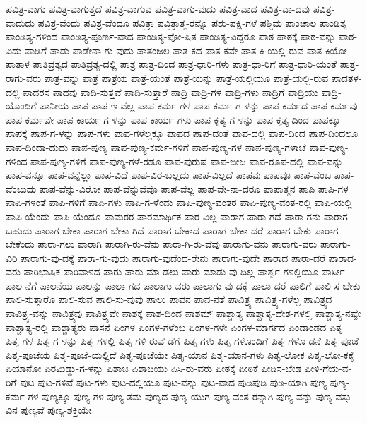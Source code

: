 {ಪವಿತ್ರ-ವಾಗು
ಪವಿತ್ರ-ವಾಗುತ್ತದೆ
ಪವಿತ್ರ-ವಾಗುವ
ಪವಿತ್ರ-ವಾಗು-ವುದು
ಪವಿತ್ರ-ವಾದ
ಪವಿತ್ರ-ವಾ-ದವು
ಪವಿತ್ರ-ವಾದುದು
ಪವಿತ್ರ-ವೆಂದು
ಪವಿತ್ರ-ವೆಂದೂ
ಪವಿತ್ರಾ
ಪವಿತ್ರಾತ್ಮ-ರನ್ನೊ
ಪಶು-ಪಕ್ಷಿ-ಗಳೆ
ಪಶ್ಚಿಮ
ಪಾಂಚಾಲ
ಪಾಂಡಿತ್ಯ
ಪಾಂಡಿತ್ಯ-ಗಳಿಂದ
ಪಾಂಡಿತ್ಯ-ಪೂರ್ಣ-ವಾದ
ಪಾಂಡಿತ್ಯ-ಪೋ-ಷಿತ
ಪಾಂಡಿತ್ಯ-ವಿದ್ದರೂ
ಪಾಠ
ಪಾಠಕ್ಕೆ
ಪಾಠ-ವನ್ನು
ಪಾಠ-ವಿದು
ಪಾಡಿಗೆ
ಪಾಡು
ಪಾಡೇನಾ-ಗು-ವುದು
ಪಾತಂಜಲ
ಪಾತ-ಕದ
ಪಾತ-ಕವೇ
ಪಾತ-ಕಿ-ಯಲ್ಲಿ-ರುವ
ಪಾತ-ಕಿಯೋ
ಪಾತಾಳ
ಪಾತಿವ್ರತ್ಯದ
ಪಾತಿವ್ರತ್ಯ-ದಲ್ಲಿ
ಪಾತ್ರ
ಪಾತ್ರ-ದಿಂದ
ಪಾತ್ರ-ಧಾರಿ-ಗಳು
ಪಾತ್ರ-ಧಾ-ರಿಗೆ
ಪಾತ್ರ-ಧಾರಿ-ಯಂತೆ
ಪಾತ್ರ-ರಾಗು-ವರು
ಪಾತ್ರ-ವನ್ನು
ಪಾತ್ರೆ
ಪಾತ್ರೆಯ
ಪಾತ್ರೆ-ಯಂತೆ
ಪಾತ್ರೆ-ಯನ್ನು
ಪಾತ್ರೆ-ಯಲ್ಲಿಯೂ
ಪಾತ್ರೆ-ಯಲ್ಲಿ-ರುವ
ಪಾದತಳ-ದಲ್ಲಿ
ಪಾದರಸ
ಪಾದವು
ಪಾದಿ-ಸುತ್ತವೆ
ಪಾದಿ-ಸುತ್ತಾರೆ
ಪಾದ್ರಿ
ಪಾದ್ರಿ-ಗಳ
ಪಾದ್ರಿ-ಗಳು
ಪಾದ್ರಿಗೆ
ಪಾದ್ರಿಯು
ಪಾದ್ರಿ-ಯೊಂದಿಗೆ
ಪಾನೀಯ
ಪಾಪ
ಪಾಪ-ಇ-ವೆಲ್ಲ
ಪಾಪ-ಕರ್ಮ-ಗಳ
ಪಾಪ-ಕರ್ಮ-ಗ-ಳನ್ನು
ಪಾಪ-ಕರ್ಮದ
ಪಾಪ-ಕರ್ಮವು
ಪಾಪ-ಕರ್ಮವೇ
ಪಾಪ-ಕಾರ್ಯ-ಗ-ಳನ್ನು
ಪಾಪ-ಕಾರ್ಯ-ಗಳು
ಪಾಪ-ಕೃತ್ಯ-ಗ-ಳನ್ನು
ಪಾಪ-ಕೃತ್ಯ-ದಿಂದ
ಪಾಪಕ್ಕೂ
ಪಾಪಕ್ಕೆ
ಪಾಪ-ಗ-ಳನ್ನು
ಪಾಪ-ಗಳು
ಪಾಪ-ಗಳೆಲ್ಲಕ್ಕೂ
ಪಾಪದ
ಪಾಪ-ದಂತೆ
ಪಾಪ-ದಲ್ಲಿ
ಪಾಪ-ದಿಂದ
ಪಾಪ-ದಿಂದಲೂ
ಪಾಪ-ದಿಂದಾ-ದುದು
ಪಾಪ-ಪುಣ್ಯ
ಪಾಪ-ಪುಣ್ಯ-ಕರ್ಮ-ಗಳಿಗೆ
ಪಾಪ-ಪುಣ್ಯ-ಗಳ
ಪಾಪ-ಪುಣ್ಯ-ಗಳಾಚೆ
ಪಾಪ-ಪುಣ್ಯ-ಗಳಿಂದ
ಪಾಪ-ಪುಣ್ಯ-ಗಳಿಗೆ
ಪಾಪ-ಪುಣ್ಯ-ಗಳೆ-ರಡೂ
ಪಾಪ-ಪುರುಷ
ಪಾಪ-ಬೀಜ
ಪಾಪ-ರೂಪ-ದಲ್ಲಿ
ಪಾಪ-ವನ್ನು
ಪಾಪ-ವನ್ನೂ
ಪಾಪ-ವನ್ನೆಲ್ಲಾ
ಪಾಪ-ವಿದೆ
ಪಾಪ-ವಿರ-ಬಲ್ಲದು
ಪಾಪ-ವಿಲ್ಲದೆ
ಪಾಪವು
ಪಾಪವೂ
ಪಾಪ-ವೆಂಬ
ಪಾಪ-ವೆಂಬುದು
ಪಾಪ-ವೆನ್ನು-ವಿರೋ
ಪಾಪ-ವೆನ್ನುವೆವೊ
ಪಾಪ-ವೆಲ್ಲ
ಪಾಪ-ವೇ-ನಾ-ದರೂ
ಪಾಪಾತ್ಮನ
ಪಾಪಿ
ಪಾಪಿ-ಗಳ
ಪಾಪಿ-ಗಳಂತೆ
ಪಾಪಿ-ಗಳಿಗೆ
ಪಾಪಿ-ಗಳು
ಪಾಪಿ-ಗ-ಳೆಂದು
ಪಾಪಿ-ಪುಣ್ಯ-ವಂತರ
ಪಾಪಿ-ಪುಣ್ಯ-ವಂತ-ರಲ್ಲಿ
ಪಾಪಿ-ಯಲ್ಲಿ
ಪಾಪಿ-ಯೆಂದು
ಪಾಪಿ-ಯೆಂದೂ
ಪಾಮರರ
ಪಾರಮಾರ್ಥಿಕ
ಪಾರ-ವಿಲ್ಲ
ಪಾರಾಗ
ಪಾರಾ-ಗದೆ
ಪಾರಾ-ಗನು
ಪಾರಾಗ-ಬಹುದು
ಪಾರಾಗ-ಬೇಕಾ
ಪಾರಾಗ-ಬೇಕಾ-ಗಿದೆ
ಪಾರಾಗ-ಬೇಕಾದ
ಪಾರಾಗ-ಬೇಕಾ-ದರೆ
ಪಾರಾಗ-ಬೇಕು
ಪಾರಾಗ-ಬೇಕೆಂದು
ಪಾರಾ-ಗಲು
ಪಾರಾಗಿ
ಪಾರಾಗಿ-ರು-ವೆನು
ಪಾರಾ-ಗಿ-ರು-ವೆವು
ಪಾರಾಗು-ವನು
ಪಾರಾಗು-ವರು
ಪಾರಾಗು-ವಿರಿ
ಪಾರಾಗು-ವು-ದಕ್ಕೆ
ಪಾರಾ-ಗು-ವುದು
ಪಾರಾಗು-ವುದೆಂದ-ರೇನು
ಪಾರಾಗು-ವುದೇ
ಪಾರಾದ
ಪಾರಾ-ದರೆ
ಪಾರಾದ-ವರು
ಪಾರಿಭಾಷಿಕ
ಪಾರಿವಾಳದ
ಪಾರು
ಪಾರು-ಮಾ-ಡಲು
ಪಾರು-ಮಾಡು-ವು-ದಿಲ್ಲ
ಪಾರ್ಶ್ವ-ಗಳಲ್ಲಿಯೂ
ಪಾರ್ಸೀ
ಪಾಲ-ನೆಗೆ
ಪಾಲನೆಯ
ಪಾಲನ್ನು
ಪಾಲಾ-ಗದ
ಪಾಲಾಗು-ವರು
ಪಾಲಾಗು-ವು-ದಕ್ಕೆ
ಪಾಲಾ-ದರೆ
ಪಾಲಿಗೆ
ಪಾಲಿ-ಸ-ಬೇಕು
ಪಾಲಿ-ಸುತ್ತಾರೊ
ಪಾಲಿ-ಸುವ
ಪಾಲಿ-ಸು-ವುವು
ಪಾಲು
ಪಾವನ
ಪಾವ-ನತೆ
ಪಾವಿತ್ರ್ಯ
ಪಾವಿತ್ರ್ಯ-ಗಳೆಲ್ಲ
ಪಾವಿತ್ರ್ಯದ
ಪಾವಿತ್ರ್ಯ-ವನ್ನು
ಪಾವಿತ್ರ್ಯವು
ಪಾವಿತ್ರ್ಯವೇ
ಪಾಶಕ್ಕೆ
ಪಾಶ-ದಿಂದ
ಪಾಶಮ್
ಪಾಶ್ಚಾತ್ಯ
ಪಾಶ್ಚಾತ್ಯ-ದೇಶ-ಗಳಲ್ಲಿ
ಪಾಶ್ಚಾತ್ಯ-ನಷ್ಟೇ
ಪಾಶ್ಚಾತ್ಯ-ರಲ್ಲಿ
ಪಾಶ್ಚಾತ್ಯರು
ಪಾಸನೆ
ಪಿಂಗಳ
ಪಿಂಗಳ-ಗಳೆಂಬ
ಪಿಂಗಳ-ಗಳೇ
ಪಿಂಗಳ-ಮಾರ್ಗದ
ಪಿಂಡಾಂಡದ
ಪಿತೃ
ಪಿತೃ-ಗಳ
ಪಿತೃ-ಗ-ಳನ್ನು
ಪಿತೃ-ಗಳಲ್ಲಿ
ಪಿತೃ-ಗಳಿ-ರುವೆ-ಡೆಗೆ
ಪಿತೃ-ಗಳು
ಪಿತೃ-ಗಳೊಂದಿಗೆ
ಪಿತೃ-ಗಳೊ-ಡನೆ
ಪಿತೃ-ಪೂಜೆ
ಪಿತೃ-ಪೂಜೆಯ
ಪಿತೃ-ಪೂಜೆ-ಯಲ್ಲಿದೆ
ಪಿತೃ-ಪೂಜೆಯೇ
ಪಿತೃ-ಯಾನ
ಪಿತೃ-ಯಾನ-ಗಳು
ಪಿತೃ-ಲೋಕ
ಪಿತೃ-ಲೋ-ಕಕ್ಕೆ
ಪಿಯಾನೋ
ಪಿರಮಿಡ್ಡು-ಗ-ಳನ್ನು
ಪಿಶಾಚಿ
ಪಿಶಾಚಿಯು
ಪಿಸಿ-ರು-ವರು
ಪೀಠಕ್ಕೆ
ಪೀಠಿಕೆ
ಪೀಡಿಸ-ಬೇಡ
ಪೀಳಿ-ಗೆಯ-ವ-ರಿಗೆ
ಪುಟ
ಪುಟ-ಗಳಿವೆ
ಪುಟ-ಗಳು
ಪುಟ-ದಲ್ಲಿಯೂ
ಪುಟ-ವನ್ನು
ಪುಟ-ವಾದ
ಪುಡಿಪುಡಿ
ಪುಡಿ-ಯಾಗಿ
ಪುಣ್ಯ
ಪುಣ್ಯ-ಕರ್ಮ-ಗಳ
ಪುಣ್ಯಕ್ಕೂ
ಪುಣ್ಯ-ಗಳ
ಪುಣ್ಯ-ತಮ
ಪುಣ್ಯದ
ಪುಣ್ಯ-ಯುಗ
ಪುಣ್ಯ-ವಂತ-ರನ್ನಾಗಿ
ಪುಣ್ಯ-ವನ್ನು
ಪುಣ್ಯ-ವಸ್ತು-ವಿನ
ಪುಣ್ಯವೆ
ಪುಣ್ಯ-ಶಕ್ತಿಯೇ
}
